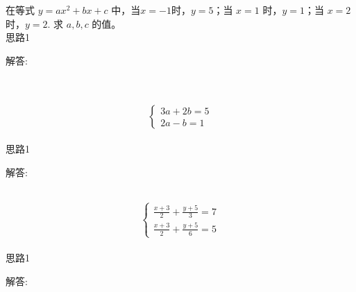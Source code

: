 \item {
    在等式 $y=ax^2+bx+c$ 中，当$x=-1$时，$y=5$；当 $x=1$ 时，$y=1$；当 $x=2$时，$y=2$. 求 $a,b,c$ 的值。
    \ifshowSolution
        \fangsong{}
        \\
        思路1

        解答: 
    \else
        \\ \\ \\ 
    \fi
}

\item {
    \[\left\{
        \begin{array}{l}
            3a + 2b = 5 \\
            2a - b = 1
        \end{array}
    \right.\]
    \ifshowSolution
        \fangsong{}
        \\
        思路1

        解答: 
    \else
        \\ \\ 
    \fi
}

\item {
    \[\left\{
        \begin{array}{l}
            \frac{x+3}{2} + \frac{y+5}{3} = 7 \\
            \frac{x+3}{2} + \frac{y+5}{6} = 5
        \end{array}
    \right.\]
    \ifshowSolution
        \fangsong{}
        \\
        思路1

        解答: 
    \else
        \\ \\ 
    \fi
}
